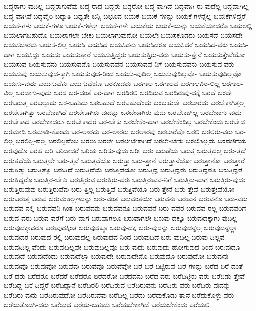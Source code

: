 {ಬದ್ಧರಾಗು-ವುದಿಲ್ಲ
ಬದ್ಧರಾಗುವೆವು
ಬದ್ಧ-ರಾದ
ಬದ್ಧರು
ಬದ್ಧರೋ
ಬದ್ಧ-ವಾಗಿದೆ
ಬದ್ಧವಾಗಿ-ರು-ವುದೆಲ್ಲ
ಬದ್ಧವಾಗಿಲ್ಲ
ಬದ್ಧ-ವಾಗಿವೆ
ಬದ್ಧವೈರಿ
ಬಧ್ನಾತಿ
ಬಧ್ಯತೇ
ಬನ್ನಿ
ಬಭೂವ
ಬಯಕೆ
ಬಯಕೆ-ಗಳನ್ನು
ಬಯಕೆ-ಗಳನ್ನೆಲ್ಲ
ಬಯಕೆಗಳಿದ್ದರೆ
ಬಯಕೆ-ಗಳು
ಬಯಕೆ-ಗಳೂ
ಬಯಕೆ-ಗಳೆಲ್ಲಾ
ಬಯಕೆ-ಗಳೇ
ಬಯಕೆಯ
ಬಯಕೆ-ಯನ್ನು
ಬಯಕೆಯಾದರೊ
ಬಯಲಲ್ಲಿ
ಬಯಲಾಗಬಹುದೊ
ಬಯಲಾಗಲೇ-ಬೇಕು
ಬಯಲಾಗುವುದೋ
ಬಯಲೇ
ಬಯಸಕೂಡದು
ಬಯಸದೆ
ಬಯಸದೇ
ಬಯಸಬಾರದು
ಬಯಸ-ಲಿಲ್ಲ
ಬಯಸಿ
ಬಯಸಿದ
ಬಯಸಿದನು
ಬಯಸಿದರೂ
ಬಯಸಿದರೆ
ಬಯಸಿದ-ವರು
ಬಯಸಿ-ದಾಗ
ಬಯಸಿದ್ದು
ಬಯಸು
ಬಯಸುತ್ತಾರೆ
ಬಯಸುತ್ತಿದ್ದರು
ಬಯಸುತ್ತಿರು-ವರು
ಬಯಸು-ತ್ತೇನೆ
ಬಯಸುತ್ತೇವೆಯೋ
ಬಯಸುವ
ಬಯಸುವನು
ಬಯಸುವನೊ
ಬಯಸುವವನ
ಬಯಸುವವ-ನಿಗೆ
ಬಯಸುವವನು
ಬಯಸುವ-ವರು
ಬಯಸುವು
ಬಯಸುವುದ-ಕ್ಕಾಗಿ
ಬಯಸುವುದ-ರಿಂದ
ಬಯಸು-ವುದಿಲ್ಲ
ಬಯಸುವುದಿಲ್ಲವೊ-
ಬಯಸುವುದಿಲ್ಲವೋ
ಬಯಸು-ವುದು
ಬಯಸುವೆನು
ಬಯಸುವೆಯೊ
ಬರಕೂಡದು
ಬರಗಾಲ
ಬರಗಾಲದ
ಬರಗಾಲವಿರ-ಲಿಲ್ಲ
ಬರಗಾಲ-ವಿಲ್ಲ
ಬರಡಾಗು-ವುದು
ಬರದ
ಬರ-ದಂತೆ
ಬರ-ದಾಗ
ಬರದಿರಲಿ
ಬರದಿರುವ
ಬರದಿರುವು-ದಕ್ಕೆ
ಬರದೆ
ಬರದೇ
ಬರಬರುತ್ತ
ಬರಬಲ್ಲುದು
ಬರ-ಬಹುದು
ಬರಬಹುದೆ
ಬರಬಹುದೆಂದು
ಬರಬಹುದೇ
ಬರಬಾರದು
ಬರಬೇಕಾಗಿತ್ತಲ್ಲ
ಬರಬೇಕಾಗಿತ್ತು
ಬರಬೇಕಾಗಿದೆ
ಬರಬೇಕಾಗಿರು-ವುದನ್ನು
ಬರಬೇಕಾಗಿರು-ವುದು
ಬರಬೇಕಾಗಿಲ್ಲ
ಬರಬೇಕಾಗು-ವುದು
ಬರಬೇಕಾದ
ಬರಬೇಕಾದರೂ
ಬರಬೇಕಾದರೆ
ಬರ-ಬೇಕು
ಬರಬೇಕೆಂ-ದಾಗ
ಬರಬೇಕೆಂದಿಲ್ಲ
ಬರಬೇಕೆಂದು
ಬರಬೇಡ
ಬರಮಾಡಿ
ಬರಮಾಡಿ-ಕೊಂಡು
ಬರ-ಲಾರದು
ಬರ-ಲಾರರು
ಬರಲಾರವು
ಬರಲಾರೆವೊ
ಬರಲಿ
ಬರಲಿರು-ವರು
ಬರ-ಲಿಲ್ಲ
ಬರಲಿಲ್ಲ-ವಲ್ಲ
ಬರಲಿಲ್ಲವೆಂಬ
ಬರಲು
ಬರಲೇ
ಬರಲೇಬೇಕಾಗಿದೆ
ಬರಲೇ-ಬೇಕು
ಬರಲೊಲ್ಲದು
ಬರವಣಿಗೆಯ
ಬರವುದೊ
ಬರಹ
ಬರಿ
ಬರಿದಾದರೆ
ಬರಿಯ
ಬರಿಸು-ವುದು
ಬರೀ
ಬರು
ಬರುಡೆಯ
ಬರುತ್ತ
ಬರುತ್ತದಲ್ಲ
ಬರು-ತ್ತದೆ
ಬರುತ್ತದೆಯೆ
ಬರುತ್ತಲೇ
ಬರು-ತ್ತವೆ
ಬರುತ್ತವೆಯೊ
ಬರುತ್ತಾ
ಬರು-ತ್ತಾನೆ
ಬರುತ್ತಾನೆಯೋ
ಬರುತ್ತಾನೋ
ಬರುತ್ತಾರೆ
ಬರುತ್ತಿತ್ತು
ಬರುತ್ತಿತ್ತೊ
ಬರುತ್ತಿದೆ
ಬರುತ್ತಿದೆಯೆ
ಬರುತ್ತಿದೆಯೋ
ಬರುತ್ತಿದ್ದ
ಬರುತ್ತಿದ್ದರು
ಬರುತ್ತಿದ್ದರೂ
ಬರುತ್ತಿದ್ದರೆ
ಬರುತ್ತಿದ್ದರೊ
ಬರುತ್ತಿರ-ಬೇಕು
ಬರುತ್ತಿರುವ
ಬರುತ್ತಿರು-ವರು
ಬರುತ್ತಿರುವವ-ನಿಗೆ
ಬರುತ್ತಿರು-ವಾಗ
ಬರುತ್ತಿರು-ವುದು
ಬರುತ್ತಿರುವುವು
ಬರುತ್ತಿರುವೆವು
ಬರು-ತ್ತಿಲ್ಲ
ಬರುತ್ತಿವೆ
ಬರುತ್ತಿವೆಯೊ
ಬರು-ತ್ತೇನೆ
ಬರು-ತ್ತೇವೆ
ಬರುತ್ತೇವೆಯೋ
ಬರುಬರುತ್ತ
ಬರುವ
ಬರುವಂತಿಲ್ಲಇದನ್ನು
ಬರು-ವಂತೆ
ಬರುವಂತೆಯೇ
ಬರುವನು
ಬರುವನೆ
ಬರುವನೊ
ಬರು-ವರು
ಬರುವವ-ನಲ್ಲಿ
ಬರುವವನಿ-ಗಿಂತ
ಬರುವವನು
ಬರುವವನೂ
ಬರುವವನೆ
ಬರು-ವವರ
ಬರುವವ-ರಲ್ಲ
ಬರುವವರಿಗೆ
ಬರುವ-ವರು
ಬರುವ-ವರೆಗೆ
ಬರು-ವಾಗ
ಬರುವಾಗಲೂ
ಬರುವಾಗಲೇ
ಬರುವು-ದಕ್ಕೂ
ಬರುವುದಕ್ಕಾಗು-ವುದಿಲ್ಲ
ಬರುವುದಕ್ಕಾದರೂ
ಬರುವುದಕ್ಕಿಂತ
ಬರುವುದಕ್ಕೂ
ಬರುವು-ದಕ್ಕೆ
ಬರು-ವುದನ್ನು
ಬರುವುದನ್ನೆಲ್ಲ
ಬರುವುದನ್ನೆಲ್ಲಾ
ಬರುವುದರ
ಬರುವುದ-ರಲ್ಲಿ
ಬರುವುದಲ್ಲ
ಬರುವುದವ-ನಿಂದ
ಬರುವುದಿದೆ
ಬರು-ವುದಿಲ್ಲ
ಬರುವು-ದಿಲ್ಲವೆ
ಬರುವುದಿಲ್ಲ-ವೆಂದು
ಬರುವುದಿಲ್ಲವೇ
ಬರುವುದಿಲ್ಲವೊ
ಬರು-ವುದು
ಬರುವುದು-ಹೋಗುವುದ-ರಿಂದ
ಬರುವುದೂ
ಬರುವುದೆ
ಬರುವುದೆಂದು
ಬರುವುದೆಲ್ಲಾ
ಬರುವುದೇ
ಬರುವುದೇನೊ
ಬರುವುದೊ
ಬರುವುದೋ
ಬರುವುವು
ಬರುವುವೊ
ಬರುವುವೋ
ಬರುವೆವು
ಬರುವೆವೊ
ಬರುವೆವೋ
ಬರೆ
ಬರೆ-ದಿಟ್ಟಿರುವ
ಬರೆ-ಗಳನ್ನು
ಬರೆದ
ಬರೆ-ದಂತೆ
ಬರೆ-ದರು
ಬರೆದರೂ
ಬರೆದರೆ
ಬರೆದರೊ
ಬರೆದರೋ
ಬರೆದವನು
ಬರೆದ-ವರು
ಬರೆದಿಟ್ಟಿರು-ವರು
ಬರೆದಿಡು-ತ್ತೇವೆ
ಬರೆದಿದ್ದ
ಬರೆ-ದಿದ್ದರೆ
ಬರೆದಿದ್ದಾನೆ
ಬರೆದಿರಲಿ
ಬರೆದಿರುವ
ಬರೆದಿರುವನು
ಬರೆದಿರು-ವರು
ಬರೆದಿರು-ವುದನ್ನು
ಬರೆದಿರು-ವುದು
ಬರೆದಿರುವುದೋ
ಬರೆದಿರುವೆವು
ಬರೆದಿಲ್ಲ
ಬರೆದು
ಬರೆದುಕೊಡು-ತ್ತಾನೆ
ಬರೆದುಕೊಳ್ಳು-ವರು
ಬರೆಯತೊಡಗಿ-ದರು
ಬರೆಯದ
ಬರೆಯ-ಬಹುದು
ಬರೆಯಬೇಕಾಗಿದೆ
ಬರೆಯಬೇಕೆಂದು
ಬರೆಯಲಿ
}
